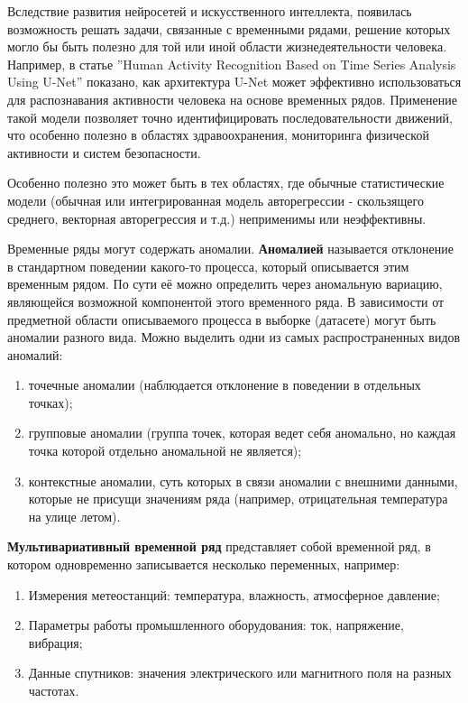 \documentclass[spec, och, diploma]{SCWorks}
\begin{document}
    Вследствие развития нейросетей и искусственного интеллекта, появилась
    возможность решать задачи, связанные с временными рядами, решение которых
    могло бы быть полезно для той или иной области жизнедеятельности человека.
    Например, в статье ''Human Activity Recognition Based on Time Series
    Analysis Using U-Net'' показано, как архитектура U-Net может эффективно
    использоваться для распознавания активности человека на основе временных
    рядов. Применение такой модели позволяет точно идентифицировать
    последовательности движений, что особенно полезно в областях
    здравоохранения, мониторинга физической активности и систем безопасности.
    \cite{unet}
 
    Особенно полезно это может быть в тех областях, где обычные статистические
    модели (обычная или интегрированная модель авторегрессии - скользящего
    среднего, векторная авторегрессия и т.д.) неприменимы или неэффективны.

    Временные ряды могут содержать аномалии. \textbf{Аномалией} называется
    отклонение в стандартном поведении какого-то процесса, который описывается
    этим временным рядом. По сути её можно определить через аномальную вариацию,
    являющейся возможной компонентой этого временного ряда. В зависимости от
    предметной области описываемого процесса в выборке (датасете) могут быть
    аномалии разного вида. Можно выделить одни из самых распространенных видов
    аномалий:

    \begin{enumerate}
        \item точечные аномалии (наблюдается отклонение в поведении в отдельных
        точках);
        \item групповые аномалии (группа точек, которая ведет себя аномально, но
        каждая точка которой отдельно аномальной не является);
        \item контекстные аномалии, суть которых в связи аномалии с внешними
        данными, которые не присущи значениям ряда (например, отрицательная
        температура на улице летом).
    \end{enumerate}

    \textbf{Мультивариативный временной ряд} представляет собой временной ряд, в
    котором одновременно записывается несколько переменных, например:

    \begin{enumerate}
        \item Измерения метеостанций: температура, влажность, атмосферное
        давление;
        \item Параметры работы промышленного оборудования: ток, напряжение,
        вибрация;
        \item Данные спутников: значения электрического или магнитного поля на
        разных частотах.
    \end{enumerate}
\end{document}
